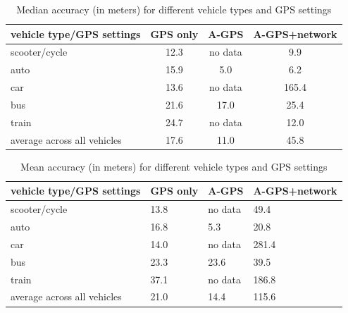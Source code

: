 \documentclass[12pt]{report}
\begin{document}
 \begin{table}[h]

   \centering
   \caption{Median accuracy (in meters) for different vehicle types and GPS
     settings}
   \label{median_accuracy_table}
   \begin{tabular}{|l|c|c|c|}
     \hline
     vehicle type/GPS settings & GPS only & A-GPS & A-GPS+network \\ \hline
     scooter/cycle                         & 12.3     & no data      & 9.9                  \\ \hline
     auto                                  & 15.9     & 5.0          & 6.2                  \\ \hline
     car                                   & 13.6     & no data      & 165.4                \\ \hline
     bus                                   & 21.6     & 17.0         & 25.4                 \\ \hline
     train                                 & 24.7     & no data      & 12.0                 \\ \hline
     average across all vehicles           & 17.6     & 11.0         & 45.8                 \\ \hline
   \end{tabular}

 \end{table}

\begin{table}[h]
  \centering
  \caption{Mean accuracy (in meters) for different vehicle types and GPS
    settings}
  \label{mean_accuracy_table}
  \begin{tabular}{|l|l|l|l|}
    \hline
    vehicle type/GPS settings   & GPS only & A-GPS & A-GPS+network \\ \hline
    scooter/cycle               & 13.8     & no data      & 49.4                 \\ \hline
    auto                        & 16.8     & 5.3          & 20.8                 \\ \hline
    car                         & 14.0     & no data      & 281.4                \\ \hline
    bus                         & 23.3     & 23.6         & 39.5                 \\ \hline
    train                       & 37.1     & no data      & 186.8                \\ \hline
    average across all vehicles & 21.0     & 14.4         & 115.6 \\  \hline
  \end{tabular}
\end{table}
\end{document}
